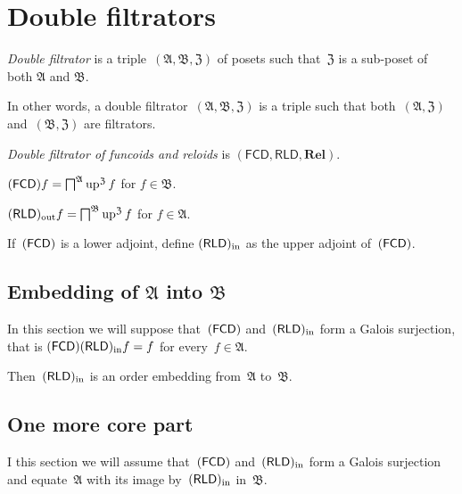 \chapter{Double filtrators}

\begin{defn}
 \emph{Double filtrator} is a triple~$(\mathfrak{A},\mathfrak{B},\mathfrak{Z})$ of posets such that~$\mathfrak{Z}$ is a sub-poset of both $\mathfrak{A}$ and $\mathfrak{B}$.
\end{defn}

In other words, a double filtrator~$(\mathfrak{A},\mathfrak{B},\mathfrak{Z})$ is a triple such that both~$(\mathfrak{A},\mathfrak{Z})$ and~$(\mathfrak{B},\mathfrak{Z})$ are filtrators.

\begin{defn}
 \emph{Double filtrator of funcoids and reloids} is
 $(\mathsf{FCD},\mathsf{RLD},\mathbf{Rel})$.
\end{defn}

\begin{defn}
 $(\mathsf{FCD}) f = \bigsqcap^{\mathfrak{A}}\operatorname{up}^{\mathfrak{Z}} f$ for $f\in\mathfrak{B}$.
\end{defn}

\begin{defn}
 $(\mathsf{RLD})_{\mathrm{out}} f = \bigsqcap^{\mathfrak{B}}\operatorname{up}^{\mathfrak{Z}} f$ for $f\in\mathfrak{A}$.
\end{defn}

\begin{defn}
 If~$(\mathsf{FCD})$ is a lower adjoint, define $(\mathsf{RLD})_{\mathrm{in}}$ as the
 upper adjoint of~$(\mathsf{FCD})$.
\end{defn}

\section{Embedding of $\mathfrak{A}$ into $\mathfrak{B}$}

In this section we will suppose that~$(\mathsf{FCD})$ and~$(\mathsf{RLD})_{\mathrm{in}}$
form a Galois surjection, that is $(\mathsf{FCD})(\mathsf{RLD})_{\mathrm{in}} f = f$
for every~$f\in\mathfrak{A}$.

Then~$(\mathsf{RLD})_{\mathrm{in}}$ is an order embedding from~$\mathfrak{A}$
to~$\mathfrak{B}$.

\section{One more core part}

I this section we will assume that~$(\mathsf{FCD})$ and~$(\mathsf{RLD})_{\mathrm{in}}$
form a Galois surjection and equate~$\mathfrak{A}$ with its
image by~$(\mathsf{RLD})_{\mathrm{in}}$ in~$\mathfrak{B}$.

